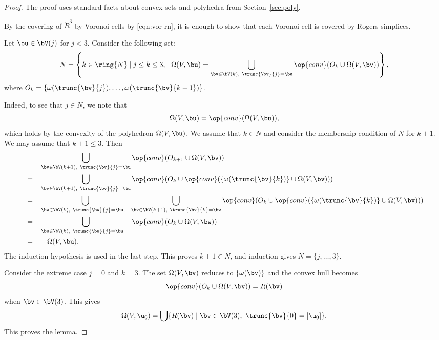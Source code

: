 \begin{proof} 
The proof uses standard facts about convex sets and polyhedra from
Section~\ref{sec:poly}.


%
By the covering of $\ring{R}^3$  by Voronoi cells by \eqref{eqn:vor-rn},
it is enough to show that each Voronoi cell is covered by Rogers
simplices.

Let $\bu\in \bV(j)$ for $j<3$.
Consider the following set:
\[  
N = \left\{k\in\ring{N}\mid j\le k\le 3, ~~\Omega(V,\bu) 
= \bigcup_{\bv \in \bV(k),~\trunc{\bv}{j}=\bu}
\op{conv}(O_k \cup\Omega(V,\bv)) %
\right\},
\] 
where $O_k = \{\omega(\trunc{\bv}{j}),\ldots,\omega(\trunc{\bv}{k-1})\}$.

  Indeed, to see that $j\in N$, we note that
\[  
\Omega(V,\bu) = \op{conv}(\Omega(V,\bu)),
\] 
which holds by the convexity of the polyhedron $\Omega(V,\bu)$.  We
assume that $k\in N$ and consider the membership condition of $N$ for
$k+1$.  We may assume that $k+1\le 3$.  Then
\begin{alignat*}{4}
&\phantom{=}&&\bigcup _{\bv \in \bV(k+1),~\trunc{\bv}{j}=\bu}
\op{conv}(O_{k+1} \cup\Omega(V,\bv))
\vspace{6pt}\\
&=&&\bigcup _{\bv \in \bV(k+1),~\trunc{\bv}{j}=\bu}
\op{conv}(O_{k} \cup\op{conv}(\{\omega(\trunc{\bv}{k})\}
\cup\Omega(V,\bv)))
\vspace{6pt}\\
&=&&\bigcup _{\bw\in \bV(k),~\trunc{\bw}{j}=\bu,~~}
\bigcup_{\bv \in \bV(k+1),~\trunc{\bv}{k}=\bw}
\op{conv}(O_{k} \cup\op{conv}(\{\omega(\trunc{\bv}{k})\}
\cup\Omega(V,\bv)))
\vspace{6pt}\\
&=&&\bigcup _{\bw\in \bV(k),~\trunc{\bw}{j}=\bu\phantom{+1}}
\op{conv}(O_{k} \cup \Omega(V,\bw)    )
\vspace{6pt}\\
&=&&\quad\Omega(V,\bu).
\end{alignat*}
The induction hypothesis is used in the last step.  
This proves $k+1\in N$, and induction gives $N=\{j,\ldots,3\}$.

Consider the extreme case $j=0$ and $k=3$.  The set $\Omega(V,\bv)$
reduces to $\{\omega(\bv)\}$ and the convex hull becomes
\[  
\op{conv}(O_{k}\cup \Omega(V,\bv)) = R(\bv)
\] 
when $\bv\in \bV(3)$.
This gives
\begin{equation} 
\Omega(V,\u_0) = 
\bigcup \{ R(\bv) \mid \bv\in \bV(3),~\trunc{\bv}{0} =[\u_0]\}.
\end{equation}
This proves the lemma.
\end{proof}


